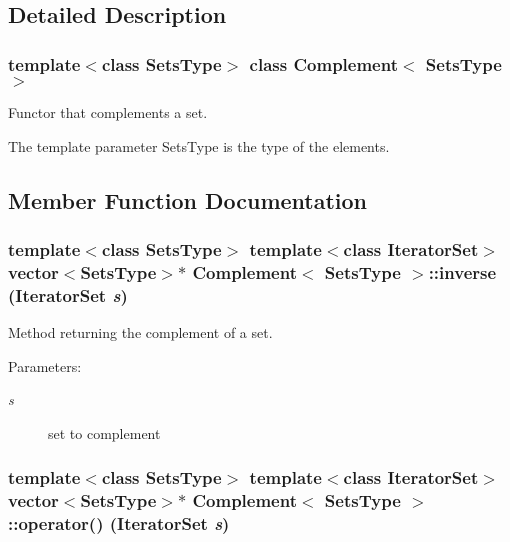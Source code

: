 \subsection{Detailed Description}
\subsubsection*{template$<$class Sets\-Type$>$ class Complement$<$ Sets\-Type $>$}

Functor that complements a set. 

The template parameter Sets\-Type is the type of the elements. 



\subsection{Member Function Documentation}
\subsubsection{\setlength{\rightskip}{0pt plus 5cm}template$<$class Sets\-Type$>$ template$<$class Iterator\-Set$>$ vector$<$Sets\-Type$>$$\ast$ {\bf Complement}$<$ Sets\-Type $>$::inverse (Iterator\-Set {\em s})\hspace{0.3cm}{\tt  [inline]}}\label{class_complement_9ff19c9282b649fa59746307d5cbdac7}


Method returning the complement of a set. 

\begin{Desc}
\item[Parameters:]
\begin{description}
\item[{\em s}]set to complement \end{description}
\end{Desc}
\subsubsection{\setlength{\rightskip}{0pt plus 5cm}template$<$class Sets\-Type$>$ template$<$class Iterator\-Set$>$ vector$<$Sets\-Type$>$$\ast$ {\bf Complement}$<$ Sets\-Type $>$::operator() (Iterator\-Set {\em s})\hspace{0.3cm}{\tt  [inline]}}\label{class_complement_8d910fa02f315d52a24b0ec094fc54f7}


